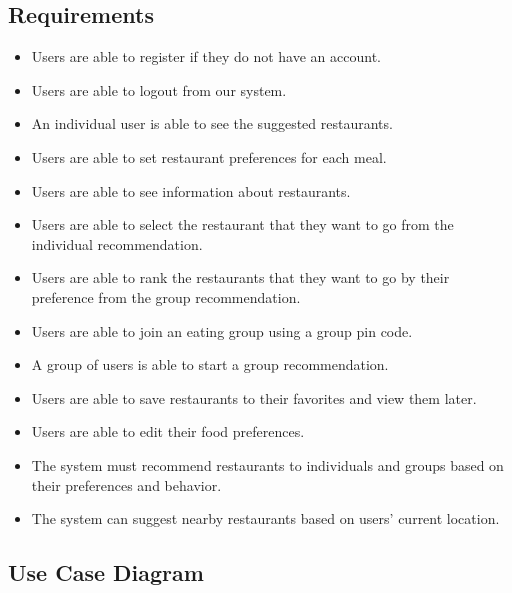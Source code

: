 \documentclass[12pt,oneside,openright,a4paper]{cpe-english-project}
\begin{document}
\subsection{Requirements}
\begin{itemize}
\item Users are able to register if they do not have an account.
\item Users are able to logout from our system.
\item An individual user is able to see the suggested restaurants.
\item Users are able to set restaurant preferences for each meal.
\item Users are able to see information about restaurants.
\item Users are able to select the restaurant that they want to go from the individual recommendation.
\item Users are able to rank the restaurants that they want to go by their preference from the group recommendation.
\item Users are able to join an eating group using a group pin code.
\item A group of users is able to start a group recommendation.
\item Users are able to save restaurants to their favorites and view them later.
\item Users are able to edit their food preferences.
\item The system must recommend restaurants to individuals and groups based on their preferences and behavior.
\item The system can suggest nearby restaurants based on users’ current location.
\end{itemize}


\newpage
\subsection{Use Case Diagram}
\end{document}
